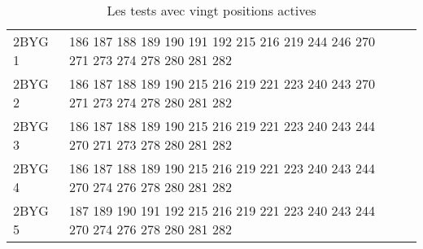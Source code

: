 \begin{table}[!htbp]
{\begin{tabular}{lll}
        2BYG 1 & 186 187 188 189 190 191 192 215 216 219 244 246 270 271 273 274 278 280 281 282 \\
        2BYG 2 & 186 187 188 189 190 215 216 219 221 223 240 243 270 271 273 274 278 280 281 282 \\
        2BYG 3 & 186 187 188 189 190 215 216 219 221 223 240 243 244 270 271 273 278 280 281 282 \\
        2BYG 4 & 186 187 188 189 190 215 216 219 221 223 240 243 244 270 274 276 278 280 281 282 \\
        2BYG 5 & 187 189 190 191 192 215 216 219 221 223 240 243 244 270 274 276 278 280 281 282 \\

        \bottomrule

      \end{tabular}
}      
      \caption{Les tests avec vingt positions actives}
\label{tab:test20}      
    \end{table}



